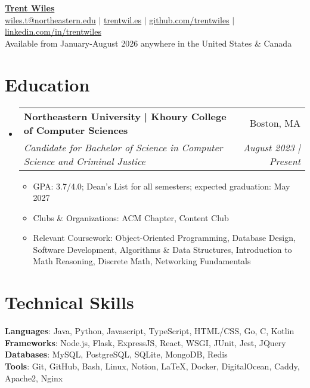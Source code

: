 \documentclass[letterpaper,10.8pt]{article}
\makeatletter
\newcommand{\resumeSubheading}[4]{
  \vspace{-1pt}\item
    \begin{tabular*}{0.97\textwidth}[t]{l@{\extracolsep{\fill}}r}
      \textbf{#1} & #2 \\
      \textit{\small#3} & \textit{\small #4} \\
    \end{tabular*}\vspace{-5pt}
}
\newcommand{\resumeSubHeadingListStart}{\begin{itemize}[leftmargin=0.15in, label={}]}
\newcommand{\resumeSubHeadingListEnd}{\end{itemize}}
\makeatother
\begin{document}
\begin{center}
\textbf{\href{https://trentwil.es/?utm_source=resume}{\Large Trent Wiles}}
\vspace{1.3pt}
\\
\href{mailto:wiles.t@northeastern.edu}{wiles.t@northeastern.edu} $|$ \href{https://trentwil.es/?utm_source=resume}{\underline{trentwil.es}} $|$ \href{https://github.com/trentwiles}{\underline{github.com/trentwiles}} $|$ \href{https://www.linkedin.com/in/trentwiles/}{\underline{linkedin.com/in/trentwiles}} \\
{Available from January-August 2026 anywhere in the United States \& Canada} \\
\end{center}

\section{Education}
  \resumeSubHeadingListStart
    \resumeSubheading
      {Northeastern University | Khoury College of Computer Sciences}{Boston, MA}
      {Candidate for Bachelor of Science in Computer Science and Criminal Justice}{August 2023 | Present}
	\small
		\begin{itemize}
		    \item {GPA: 3.7/4.0; Dean's List for all semesters; expected graduation: May 2027}
		    \item {Clubs \& Organizations: ACM Chapter, Content Club}
        \item{Relevant Coursework: Object-Oriented Programming, Database Design, Software Development, Algorithms \& Data Structures, Introduction to Math Reasoning, Discrete Math, Networking Fundamentals}
      \end{itemize}
	\normalsize

  \resumeSubHeadingListEnd



  \section{Technical Skills}
\begin{itemize}[leftmargin=0.15in, label={}]
   \small{\item{
\textbf{Languages}{: Java, Python, Javascript, TypeScript, HTML/CSS, Go, C, Kotlin} \\
\textbf{Frameworks}{: Node.js, Flask, ExpressJS, React, WSGI, JUnit, Jest, JQuery} \\
\textbf{Databases}{: MySQL, PostgreSQL, SQLite, MongoDB, Redis} \\
\textbf{Tools}{: Git, GitHub, Bash, Linux, Notion, LaTeX, Docker, DigitalOcean, Caddy, Apache2, Nginx}
   }}
\end{itemize}
\end{document}
